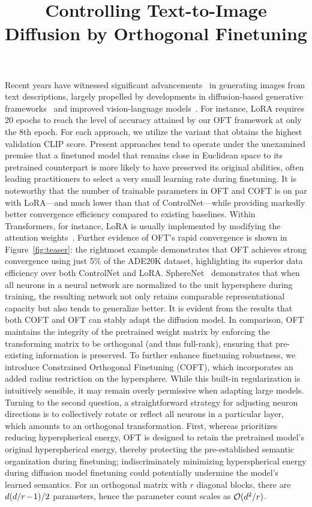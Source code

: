 \title{Controlling Text-to-Image Diffusion by Orthogonal Finetuning}
Recent years have witnessed significant advancements~\cite{saharia2022photorealistic,ramesh2022hierarchical,rombach2022high,gu2022vector,nichol2022glide} in generating images from text descriptions, largely propelled by developments in diffusion-based generative frameworks~\cite{ho2020denoising,song2021score,song2021denoising,dhariwal2021diffusion} and improved vision-language models~\cite{su2020vlbert,lu2019vilbert,radford2021learning,wang2021simvlm,li2022blip,li2023blip,alayrac2022flamingo,schuhmann2022laion}. For instance, LoRA requires 20 epochs to reach the level of accuracy attained by our OFT framework at only the 8th epoch. For each approach, we utilize the variant that obtains the highest validation CLIP score. Present approaches tend to operate under the unexamined premise that a finetuned model that remains close in Euclidean space to its pretrained counterpart is more likely to have preserved its original abilities, often leading practitioners to select a very small learning rate during finetuning. It is noteworthy that the number of trainable parameters in OFT and COFT is on par with LoRA—and much lower than that of ControlNet—while providing markedly better convergence efficiency compared to existing baselines. Within Transformers, for instance, LoRA is usually implemented by modifying the attention weights~\cite{hulora2022}. Further evidence of OFT’s rapid convergence is shown in Figure~\ref{fig:teaser}: the rightmost example demonstrates that OFT achieves strong convergence using just 5\% of the ADE20K dataset, highlighting its superior data efficiency over both ControlNet and LoRA. SphereNet~\cite{liu2017deep} demonstrates that when all neurons in a neural network are normalized to the unit hypersphere during training, the resulting network not only retains comparable representational capacity but also tends to generalize better. It is evident from the results that both COFT and OFT can stably adapt the diffusion model. In comparison, OFT maintains the integrity of the pretrained weight matrix by enforcing the transforming matrix to be orthogonal (and thus full-rank), ensuring that pre-existing information is preserved. To further enhance finetuning robustness, we introduce Constrained Orthogonal Finetuning (COFT), which incorporates an added radius restriction on the hypersphere. While this built-in regularization is intuitively sensible, it may remain overly permissive when adapting large models. Turning to the second question, a straightforward strategy for adjusting neuron directions is to collectively rotate or reflect all neurons in a particular layer, which amounts to an orthogonal transformation. First, whereas \cite{liu2021orthogonal} prioritizes reducing hyperspherical energy, OFT is designed to retain the pretrained model’s original hyperspherical energy, thereby protecting the pre-established semantic organization during finetuning; indiscriminately minimizing hyperspherical energy during diffusion model finetuning could potentially undermine the model’s learned semantics. For an orthogonal matrix with $r$ diagonal blocks, there are $\thickmuskip=2mu \medmuskip=2mu d(d/r-1)/2$ parameters, hence the parameter count scales as $\thickmuskip=2mu \medmuskip=2mu \mathcal{O}(d^2/r)$. 